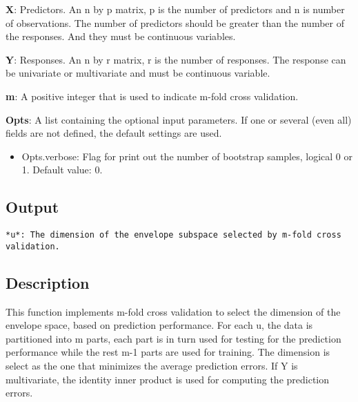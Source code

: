 \documentclass[a4paper,11pt,openany]{memoir}
\begin{document}
\begin{par}
\textbf{X}: Predictors. An n by p matrix, p is the number of predictors and n is number of observations. The number of predictors should be greater than the number of the responses. And they must be continuous variables.
\end{par} \vspace{1em}
\begin{par}
\textbf{Y}: Responses. An n by r matrix, r is the number of responses. The response can be univariate or multivariate and must be continuous variable.
\end{par} \vspace{1em}
\begin{par}
\textbf{m}: A positive integer that is used to indicate m-fold cross validation.
\end{par} \vspace{1em}
\begin{par}
\textbf{Opts}: A list containing the optional input parameters. If one or several (even all) fields are not defined, the default settings are used.
\end{par} \vspace{1em}
\begin{itemize}
\setlength{\itemsep}{-1ex}
   \item Opts.verbose: Flag for print out the number of bootstrap samples, logical 0 or 1. Default value: 0.
\end{itemize}


\subsection*{Output}


\begin{verbatim}*u*: The dimension of the envelope subspace selected by m-fold cross
validation.\end{verbatim}
    

\subsection*{Description}

\begin{par}
This function implements m-fold cross validation to select the dimension of the envelope space, based on prediction performance.  For each u, the data is partitioned into m parts, each part is in turn used for testing for the prediction performance while the rest m-1 parts are used for training.  The dimension is select as the one that minimizes the average prediction errors. If Y is multivariate, the identity inner product is used for computing the prediction errors.
\end{par} \vspace{1em}
\end{document}
